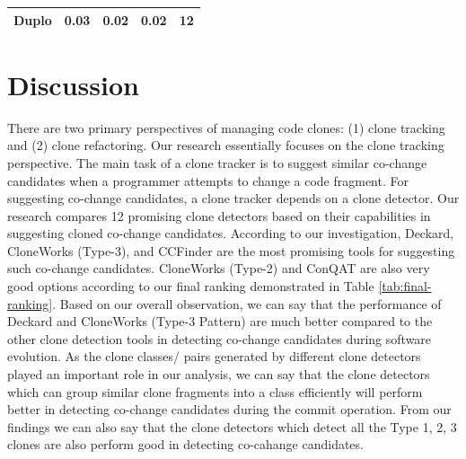 \documentclass[review]{elsarticle}
\begin{document}
\begin{table}[]
\begin{tabular}{|c|c|c|c|c|}
Duplo                                                               & 0.03                                                                   & 0.02                                                                 & \textbf{0.02}                                                         & \textbf{12}                                                                        \\ \hline
\end{tabular}
\end{table}

\vspace{2mm}
\section{Discussion}
\label{the-discussion}
There are two primary perspectives of managing code clones: (1) clone tracking and (2) clone refactoring. Our research essentially focuses on the clone tracking perspective. The main task of a clone tracker is to suggest similar co-change candidates when a programmer attempts to change a code fragment. For suggesting co-change candidates, a clone tracker depends on a clone detector. Our research compares 12 promising clone detectors based on their capabilities in suggesting cloned co-change candidates. According to our investigation, Deckard, CloneWorks (Type-3), and CCFinder are the most promising tools for suggesting such co-change candidates. CloneWorks (Type-2) and ConQAT are also very good options according to our final ranking demonstrated in Table \ref{tab:final-ranking}. Based on our overall observation, we can say that the performance of Deckard and CloneWorks (Type-3 Pattern) are much better compared to the other clone detection tools in detecting co-change candidates during software evolution. As the clone classes/ pairs generated by different clone detectors played an important role in our analysis, we can say that the clone detectors which can group similar clone fragments into a class efficiently will perform better in detecting co-change candidates during the commit operation. From our findings we can also say that the clone detectors which detect all the Type 1, 2, 3 clones are also perform good in detecting co-cahange candidates. 

\end{document}
